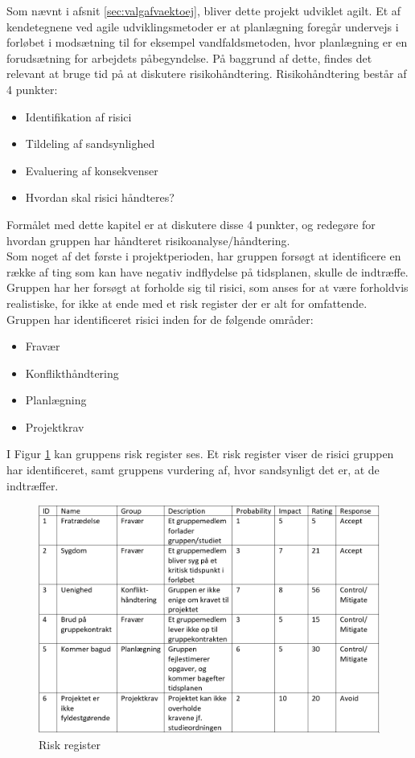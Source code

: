 Som nævnt i afsnit \ref{sec:valgafvaektoej}, bliver dette projekt udviklet agilt. Et af kendetegnene ved agile udviklingsmetoder er at 
planlægning foregår undervejs i forløbet i modsætning til for eksempel vandfaldsmetoden, hvor planlægning er en 
forudsætning for arbejdets påbegyndelse. På baggrund af dette, findes det relevant at bruge tid på at diskutere 
risikohåndtering. Risikohåndtering består af 4 punkter:

\begin{itemize}
    \item Identifikation af risici
    \item Tildeling af sandsynlighed
    \item Evaluering af konsekvenser
    \item Hvordan skal risici håndteres?
\end{itemize}

Formålet med dette kapitel er at diskutere disse 4 punkter, og redegøre for hvordan gruppen har håndteret risikoanalyse/håndtering. \\ 

Som noget af det første i projektperioden, har gruppen forsøgt at identificere en række af ting som kan have negativ indflydelse
på tidsplanen, skulle de indtræffe. Gruppen har her forsøgt at forholde sig til risici, som anses for at være forholdvis realistiske, for ikke
at ende med et risk register der er alt for omfattende. Gruppen har identificeret risici inden for de følgende områder:

\begin{itemize}
    \item Fravær
    \item Konflikthåndtering
    \item Planlægning
    \item Projektkrav
\end{itemize}

I Figur \ref{fig:riskregister} kan gruppens risk register ses. Et risk register viser de risici gruppen har identificeret, samt gruppens vurdering af, hvor sandsynligt det er, at de indtræffer.

\begin{figure}[H]
    \centering
    \includegraphics[width=\textwidth]{figures/RiskRegister.png}
    \caption{Risk register}
    \label{fig:riskregister}
\end{figure}

